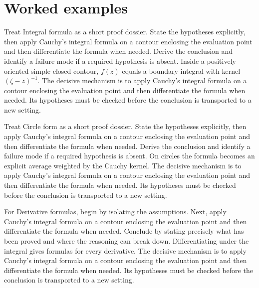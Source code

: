\section{Worked examples}

\begin{example}\label{ex:iv06-worked-01}
Treat Integral formula as a short proof dossier. State the hypotheses explicitly, then apply Cauchy's integral formula on a contour enclosing the evaluation point and then differentiate the formula when needed. Derive the conclusion and identify a failure mode if a required hypothesis is absent. Inside a positively oriented simple closed contour, $f(z)$ equals a boundary integral with kernel $(\zeta-z)^{-1}$. The decisive mechanism is to apply Cauchy's integral formula on a contour enclosing the evaluation point and then differentiate the formula when needed. Its hypotheses must be checked before the conclusion is transported to a new setting.
\end{example}

\begin{example}\label{ex:iv06-worked-02}
Treat Circle form as a short proof dossier. State the hypotheses explicitly, then apply Cauchy's integral formula on a contour enclosing the evaluation point and then differentiate the formula when needed. Derive the conclusion and identify a failure mode if a required hypothesis is absent. On circles the formula becomes an explicit average weighted by the Cauchy kernel. The decisive mechanism is to apply Cauchy's integral formula on a contour enclosing the evaluation point and then differentiate the formula when needed. Its hypotheses must be checked before the conclusion is transported to a new setting.
\end{example}

\begin{example}\label{ex:iv06-worked-03}
For Derivative formulas, begin by isolating the assumptions. Next, apply Cauchy's integral formula on a contour enclosing the evaluation point and then differentiate the formula when needed. Conclude by stating precisely what has been proved and where the reasoning can break down. Differentiating under the integral gives formulas for every derivative. The decisive mechanism is to apply Cauchy's integral formula on a contour enclosing the evaluation point and then differentiate the formula when needed. Its hypotheses must be checked before the conclusion is transported to a new setting.
\end{example}

